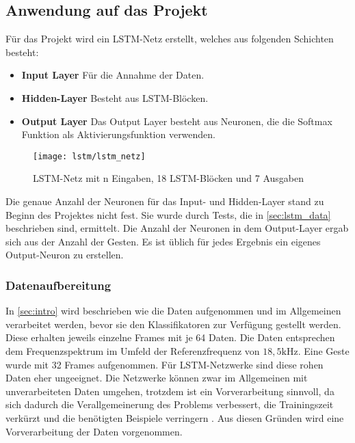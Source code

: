 \subsection{Anwendung auf das Projekt}
Für das Projekt wird ein LSTM-Netz erstellt, welches aus folgenden Schichten besteht:

\begin{itemize}
\item \textbf{Input Layer} Für die Annahme der Daten.
\item \textbf{Hidden-Layer} Besteht aus LSTM-Blöcken.
\item \textbf{Output Layer} Das Output Layer besteht aus Neuronen, die die 
Softmax Funktion als Aktivierungsfunktion verwenden.
\end{itemize}

\begin{figure}[htbp]
    \centering
   \texttt{[image: lstm/lstm\_netz]}
\caption[LSTM-Netz]{LSTM-Netz mit n Eingaben, 18 LSTM-Blöcken und 7 Ausgaben}
\label{fig:lstm_netz}
\end{figure}
Die genaue Anzahl der Neuronen für das Input- und Hidden-Layer stand zu Beginn
des Projektes nicht fest. Sie wurde durch Tests, die in \autoref{sec:lstm_data}
beschrieben sind, ermittelt. Die Anzahl der Neuronen in dem Output-Layer ergab
sich aus der Anzahl der Gesten. Es ist üblich für jedes Ergebnis ein eigenes
Output-Neuron zu erstellen.

\subsubsection{Datenaufbereitung}
\label{sec:lstm_data} 

In \autoref{sec:intro} wird beschrieben wie die Daten aufgenommen und im
Allgemeinen verarbeitet werden, bevor sie den Klassifikatoren zur Verfügung
gestellt werden. Diese erhalten jeweils einzelne Frames mit je 64 Daten. Die
Daten entsprechen dem Frequenzspektrum im Umfeld der Referenzfrequenz von
$18,5\text{kHz}$. Eine Geste wurde mit 32 Frames aufgenommen. Für
\ac{LSTM}-Netzwerke sind diese rohen Daten eher ungeeignet. Die Netzwerke können
zwar im Allgemeinen mit unverarbeiteten Daten umgehen, trotzdem ist ein
Vorverarbeitung sinnvoll, da sich dadurch die Verallgemeinerung des Problems
verbessert, die Trainingszeit verkürzt und die benötigten Beispiele verringern
\cite{RainerSchmoll2006}. Aus diesen Gründen wird eine Vorverarbeitung der Daten
vorgenommen.

